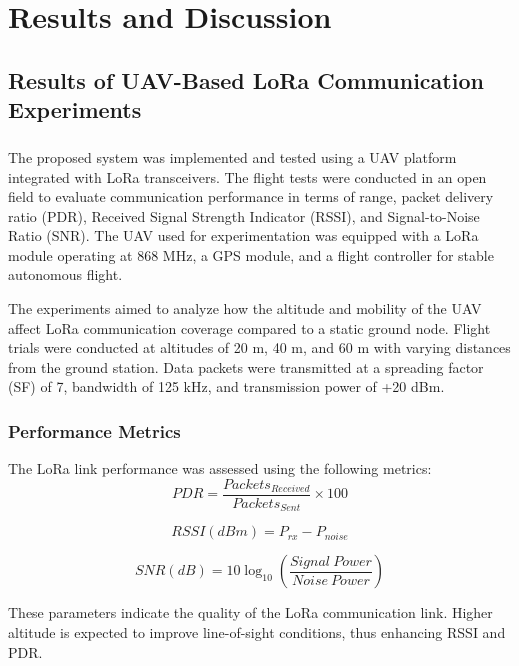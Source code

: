 \chapter{Results and Discussion}

\section{Results of UAV-Based LoRa Communication Experiments}
\paragraph{}
The proposed system was implemented and tested using a UAV platform integrated with LoRa transceivers. The flight tests were conducted in an open field to evaluate communication performance in terms of range, packet delivery ratio (PDR), Received Signal Strength Indicator (RSSI), and Signal-to-Noise Ratio (SNR). The UAV used for experimentation was equipped with a LoRa module operating at 868 MHz, a GPS module, and a flight controller for stable autonomous flight. 

The experiments aimed to analyze how the altitude and mobility of the UAV affect LoRa communication coverage compared to a static ground node. Flight trials were conducted at altitudes of 20 m, 40 m, and 60 m with varying distances from the ground station. Data packets were transmitted at a spreading factor (SF) of 7, bandwidth of 125 kHz, and transmission power of +20 dBm. 

\subsection{Performance Metrics}
The LoRa link performance was assessed using the following metrics:
\begin{equation*}
PDR = \frac{Packets_{Received}}{Packets_{Sent}} \times 100 \tag{5.1}
\end{equation*}

\begin{equation*}
RSSI(dBm) = P_{rx} - P_{noise} \tag{5.2}
\end{equation*}

\begin{equation*}
SNR(dB) = 10 \log_{10}\left(\frac{Signal\ Power}{Noise\ Power}\right) \tag{5.3}
\end{equation*}

These parameters indicate the quality of the LoRa communication link. Higher altitude is expected to improve line-of-sight conditions, thus enhancing RSSI and PDR.

